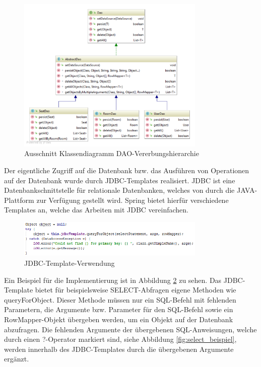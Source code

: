 	\begin{figure}[H]
		\centering 
		\includegraphics[width=0.8\textwidth]{img/dao_klassendia}
		\captionsetup{format=hang}
		\caption[Ausschnitt Klassendiagram \ac{DAO}-Vererbungshierarchie]{\label{fig:dao_klassendia}Ausschnitt Klassendiagramm \ac{DAO}-Vererbungshierarchie}
	\end{figure}

	Der eigentliche Zugriff auf die Datenbank bzw. das Ausführen von Operationen auf der Datenbank wurde durch \ac{JDBC}-Templates realisiert. \ac{JDBC} ist eine Datenbankschnittstelle für relationale Datenbanken, welches von durch die JAVA-Plattform zur Verfügung gestellt wird. \autocite{WikimediaFoundationInc.2019c} Spring bietet hierfür verschiedene Templates an, welche das Arbeiten mit JDBC vereinfachen.\autocite{PivotalSoftwareInc.b} 
	
	\begin{figure}[H]
		\centering 
		\includegraphics[width=0.8\textwidth]{img/jbdc_template_usage}
		\captionsetup{format=hang}
		\caption[\ac{JDBC}-Template-Verwendung]{\label{fig:jbdc_template_usage}\ac{JDBC}-Template-Verwendung}
	\end{figure}

	Ein Beispiel für die Implementierung ist in Abbildung \ref{fig:jbdc_template_usage} zu sehen. Das \ac{JDBC}-Template bietet für beispielsweise \glqq SELECT\grqq-Abfragen eigene Methoden wie \grqq queryForObject\grqq. Dieser Methode müssen nur ein SQL-Befehl mit fehlenden Parametern, die Argumente bzw. Parameter für den SQL-Befehl sowie ein \glqq RowMapper\grqq-Objekt übergeben werden, um ein Objekt auf der Datenbank abzufragen. Die fehlenden Argumente der übergebenen SQL-Anweisungen, welche durch einen ?-Operator markiert sind, siehe Abbildung \ref{fig:select_beispiel}, werden innerhalb des \ac{JDBC}-Templates durch die übergebenen Argumente ergänzt. 

